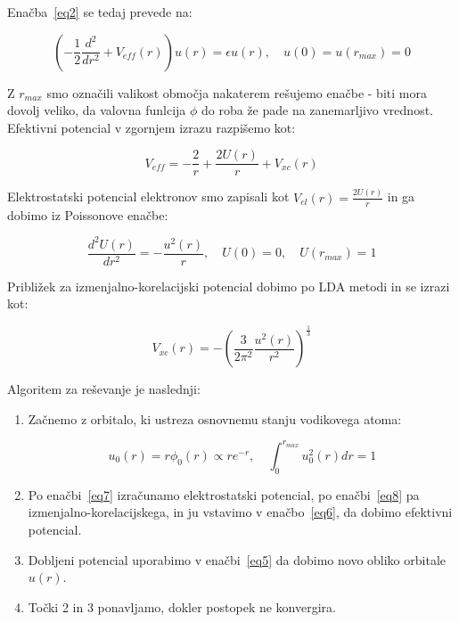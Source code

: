 \documentclass[a4paper]{article}
\newcommand{\ddr}[2]{\frac{d^2#1}{d#2^2}}
\newcommand{\half}{\frac{1}{2}}
\begin{document}
    Enačba~\ref{eq2} se tedaj prevede na:

    \begin{equation}\label{eq5}
        \left( -\half \ddr{}{r} + V_{eff}(r) \right) u(r) = \epsilon u(r), \quad u(0) = u(r_{max}) = 0
    \end{equation}

    Z $r_{max}$ smo označili valikost območja nakaterem rešujemo enačbe - biti mora dovolj veliko, da valovna funlcija
    $\phi$ do roba že pade na zanemarljivo vrednost.
    Efektivni potencial v zgornjem izrazu razpišemo kot:

    \begin{equation}\label{eq6}
        V_{eff} = -\frac{2}{r} + \frac{2U(r)}{r} + V_{xc}(r)
    \end{equation}

    Elektrostatski potencial elektronov smo zapisali kot $V_{el}(r) = \frac{2U(r)}{r}$ in ga dobimo iz Poissonove
    enačbe:

    \begin{equation}\label{eq7}
        \ddr{U(r)}{r} = - \frac{u^2(r)}{r}, \quad U(0) = 0, \quad U(r_{max}) = 1
    \end{equation}

    Približek za izmenjalno-korelacijski potencial dobimo po LDA metodi in se izrazi kot:

    \begin{equation}\label{eq8}
        V_{xc}(r) = - \left( \frac{3}{2\pi^2} \frac{u^2(r)}{r^2} \right)^{\frac{1}{3}}
    \end{equation}

    Algoritem za reševanje je naslednji:

    \begin{enumerate}
        \item Začnemo z orbitalo, ki ustreza osnovnemu stanju vodikovega atoma:

        \begin{equation}\label{eq9}
            u_0(r) = r\phi_0(r) \propto re^{-r}, \quad \int_0^{r_{max}} u_0^2(r)dr = 1
        \end{equation}

        \item Po enačbi~\ref{eq7} izračunamo elektrostatski potencial, po enačbi~\ref{eq8} pa
        izmenjalno-korelacijskega, in ju vstavimo v enačbo~\ref{eq6}, da dobimo efektivni potencial.

        \item Dobljeni potencial uporabimo v enačbi~\ref{eq5} da dobimo novo obliko orbitale $u(r)$.

        \item Točki 2 in 3 ponavljamo, dokler postopek ne konvergira.

    \end{enumerate}
\end{document}
